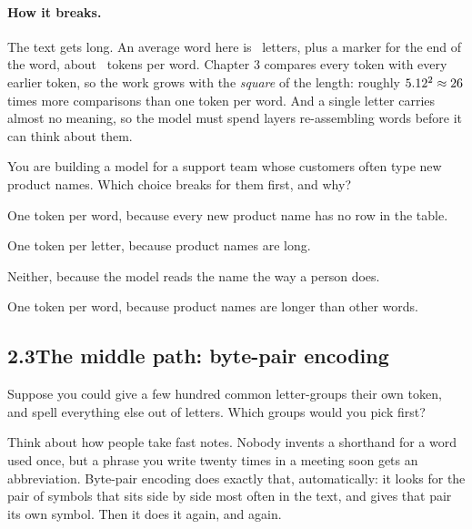 \paragraph{How it breaks.} The text gets long. An average word here is \nTwoCharsPerWord\ letters, plus a
marker for the end of the word, about \nTwoTpwZero\ tokens per word. Chapter 3 compares every token with
every earlier token, so the work grows with the \emph{square} of the length: roughly $5.12^2
\approx 26$ times more comparisons than one token per word. And a single letter carries
almost no meaning, so the model must spend layers re-assembling words before it can think about them.

\begin{checkq}
You are building a model for a support team whose customers often type new product names. Which choice
breaks for them first, and why?
\begin{options}
\item One token per word, because every new product name has no row in the table.
\item One token per letter, because product names are long.
\item Neither, because the model reads the name the way a person does.
\item One token per word, because product names are longer than other words.
\end{options}
\end{checkq}


\subsection*{2.3\quad The middle path: byte-pair encoding}

\Predict Suppose you could give a few hundred common letter-groups their own token, and spell everything
else out of letters. Which groups would you pick first?

\Picture Think about how people take fast notes. Nobody invents a shorthand for a word used once, but a
phrase you write twenty times in a meeting soon gets an abbreviation. Byte-pair encoding does exactly
that, automatically: it looks for the pair of symbols that sits side by side most often in the text, and
gives that pair its own symbol. Then it does it again, and again.

